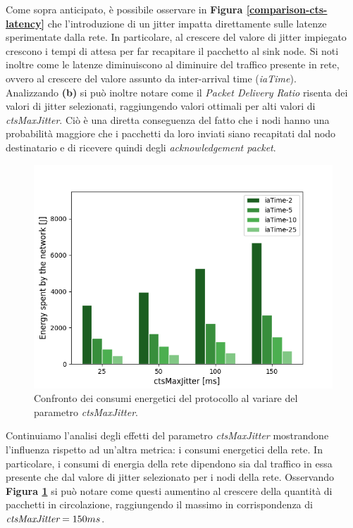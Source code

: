 \documentclass[binding=0.6cm,TFA]{sapthesis}
\begin{document}
Come sopra anticipato, è possibile osservare in \textbf{Figura \ref{comparison-cts-latency}} che l'introduzione di un jitter impatta direttamente sulle
latenze sperimentate dalla rete. In particolare, al crescere del valore di jitter impiegato crescono i tempi di attesa per far recapitare il pacchetto al sink node.
Si noti inoltre come le latenze diminuiscono al diminuire del traffico presente in rete, ovvero al crescere del valore assunto da inter-arrival time (\emph{iaTime}).\\

Analizzando \textbf{(b)} si può inoltre notare come il \emph{Packet Delivery Ratio} risenta dei valori di jitter selezionati, raggiungendo valori ottimali per
alti valori di \emph{ctsMaxJitter}. Ciò è una diretta conseguenza del fatto che i nodi hanno una probabilità maggiore che i pacchetti da loro inviati siano
recapitati dal nodo destinatario e di ricevere quindi degli \emph{acknowledgement packet}.

\begin{figure}
    \begin{center}
        \includegraphics[scale=0.5]{energy_jitter_comparison_plot.png}
        \caption{Confronto dei consumi energetici del protocollo al variare del parametro \emph{ctsMaxJitter}.}
        \label{comparison-cts-energy}
    \end{center}
\end{figure}

Continuiamo l'analisi degli effetti del parametro \emph{ctsMaxJitter} mostrandone l'influenza rispetto ad un'altra metrica: i consumi energetici della rete. In
particolare, i consumi di energia della rete dipendono sia dal traffico in essa presente che dal valore di jitter selezionato per i nodi della rete. Osservando
\textbf{Figura \ref{comparison-cts-energy}} si può notare come questi aumentino al crescere della quantità di pacchetti in circolazione, raggiungendo il
massimo in corrispondenza di $\emph{ctsMaxJitter}=150ms$.\\
\end{document}
